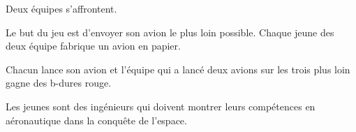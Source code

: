 \documentclass{grand-jeu}
\begin{document}
\begin{liste-materiel}
\end{liste-materiel}

\begin{regles}
Deux équipes s’affrontent.

Le but du jeu est d'envoyer son avion le plus loin possible. Chaque jeune des deux équipe fabrique un avion en papier. 

Chacun lance son avion et l'équipe qui a lancé deux avions sur les trois plus loin gagne des b-dures rouge.
\end{regles}

\begin{imaginaire}
Les jeunes sont des ingénieurs qui doivent montrer leurs compétences en aéronautique dans la conquête de l'espace.
\end{imaginaire}

\begin{moments-stop}
\end{moments-stop}
\end{document}
